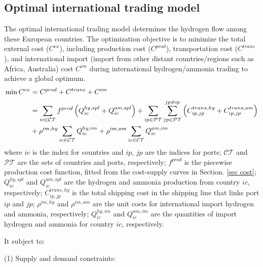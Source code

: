 \documentclass[sn-mathphys,Numbered]{sn-jnl}%
\theoremstyle{thmstyleone}%
\theoremstyle{thmstyletwo}%
\theoremstyle{thmstylethree}%
\begin{document}
\subsection{Optimal international trading model}

The optimal international trading model determines the hydrogen flow among these European countries. The optimization objective is to minimize the total external cost ($C^{ex}$), including production cost ($C^{prod}$), transportation cost ($C^{trans}$), and international import (import from other distant countries/regions such as Africa, Australia) cost $C^{im}$ during international hydrogen/ammonia trading to achieve a global optimum.  
\begin{align}
    \min C^{ex} & = C^{prod} + C^{trans} + C^{im}
    \notag \\
    & = \sum_{ic \in \mathcal{CT}} f^{prod}\left(Q_{ic}^{hy,spl} 
    + Q_{ic}^{am,spl} \right) 
     + \sum_{ip \in \mathcal{PT}} \sum_{jp \in \mathcal{PT}}^{jp \neq ip} \left(C_{ip,jp}^{trans,hy} + C_{ip,jp}^{trans,am} \right) 
     \notag\\
     & + \rho^{im,hy} \sum_{ic \in \mathcal{CT}}Q_{ic}^{hy,im} + \rho^{im,am} \sum_{ic \in \mathcal{CT}}Q_{ic}^{am,im}
\end{align}
where $ic$ is the index for countries and $ip$, $jp$ are the indices for ports; $\mathcal{CT}$ and $\mathcal{PT}$ are the sets of countries and ports, respectively; $f^{prod}$ is the piecewise production cost function, fitted from the cost-supply curves in Section. \ref{sec cost}; $Q_{ic}^{hy,spl}$ and $Q_{ic}^{am,spl}$ are the hydrogen and ammonia production from country $ic$, respectively; $C_{ip,jp}^{trans,hy}$ is the total shipping cost in the shipping line that links port $ip$ and $jp$; $\rho^{im,hy}$ and $\rho^{im,am}$ are the unit costs for international import hydrogen and ammonia, respectively; $Q_{ic}^{hy,im}$ and $Q_{ic}^{am,im}$ are the quantities of import hydrogen and ammonia for country $ic$, respectively.

It subject to:

(1) Supply and demand constraints:
\end{document}
